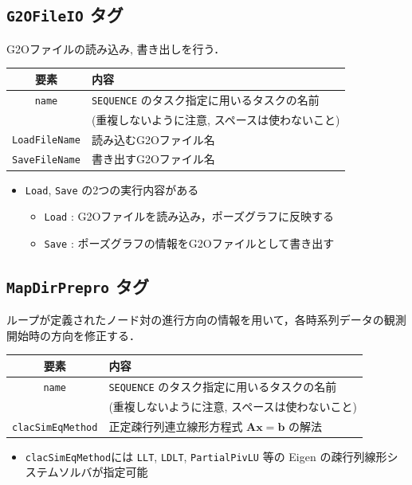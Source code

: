 \documentclass[dvipdfmx]{jsarticle}
\begin{document}
\cprotect \subsection{\verb|G2OFileIO| タグ}
G2Oファイルの読み込み, 書き出しを行う．

\begin{tabular}{c|l}
	\hline
	要素 & 内容 \\
	\hline \hline
	\verb|name| & \verb|SEQUENCE| のタスク指定に用いるタスクの名前 \vspace{-5pt}\\
		& (重複しないように注意, スペースは使わないこと) \\
	\verb|LoadFileName| & 読み込むG2Oファイル名 \\
	\verb|SaveFileName| & 書き出すG2Oファイル名 \\
	\hline
\end{tabular}

\begin{itemize}
	\item \verb|Load|, \verb|Save| の2つの実行内容がある
	\begin{itemize}
		\item[] \verb|Load| : G2Oファイルを読み込み，ポーズグラフに反映する
		\item[] \verb|Save| :  ポーズグラフの情報をG2Oファイルとして書き出す
	\end{itemize}
\end{itemize}

\cprotect \subsection{\verb|MapDirPrepro| タグ}
ループが定義されたノード対の進行方向の情報を用いて，各時系列データの観測開始時の方向を修正する．

\begin{tabular}{c|l}
	\hline
	要素 & 内容 \\
	\hline \hline
	\verb|name| & \verb|SEQUENCE| のタスク指定に用いるタスクの名前 \vspace{-5pt}\\
		& (重複しないように注意, スペースは使わないこと) \\
	\verb|clacSimEqMethod| & 正定疎行列連立線形方程式 $\bm{A} \bm{x} = \bm{b}$ の解法 \\
	\hline
\end{tabular}

\begin{itemize}
	\item \verb|clacSimEqMethod|には \verb|LLT|, \verb|LDLT|, \verb|PartialPivLU| 等の Eigen の疎行列線形システムソルバが指定可能
\end{itemize}
\end{document}
